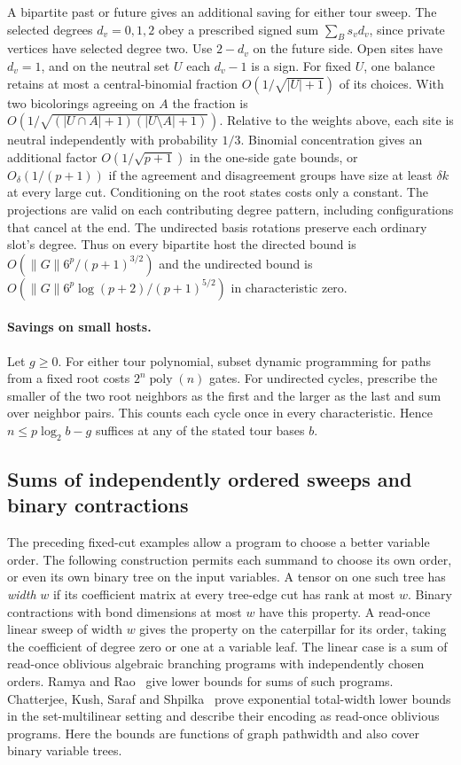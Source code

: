\documentclass[11pt]{article}
\theoremstyle{definition}
\begin{document}
A bipartite past or future gives an additional saving for either tour sweep. The selected degrees \(d_v=0,1,2\) obey a prescribed signed sum \(\sum_B s_v d_v\), since private vertices have selected degree two. Use \(2-d_v\) on the future side. Open sites have \(d_v=1\), and on the neutral set \(U\) each \(d_v-1\) is a sign. For fixed \(U\), one balance retains at most a central-binomial fraction \(O(1/\sqrt{|U|+1})\) of its choices. With two bicolorings agreeing on \(A\) the fraction is \(O(1/\sqrt{(|U\cap A|+1)(|U\setminus A|+1)})\). Relative to the weights above, each site is neutral independently with probability \(1/3\). Binomial concentration gives an additional factor \(O(1/\sqrt{p+1})\) in the one-side gate bounds, or \(O_\delta(1/(p+1))\) if the agreement and disagreement groups have size at least \(\delta k\) at every large cut. Conditioning on the root states costs only a constant. The projections are valid on each contributing degree pattern, including configurations that cancel at the end. The undirected basis rotations preserve each ordinary slot's degree. Thus on every bipartite host the directed bound is \(O(\|G\|6^p/(p+1)^{3/2})\) and the undirected bound is \(O(\|G\|6^p\log(p+2)/(p+1)^{5/2})\) in characteristic zero.

\paragraph{Savings on small hosts.} Let \(g\ge0\). For either tour polynomial, subset dynamic programming for paths from a fixed root costs \(2^n\operatorname{poly}(n)\) gates. For undirected cycles, prescribe the smaller of the two root neighbors as the first and the larger as the last and sum over neighbor pairs. This counts each cycle once in every characteristic. Hence \(n\le p\log_2 b-g\) suffices at any of the stated tour bases \(b\).

\subsection{Sums of independently ordered sweeps and binary contractions}\label{sec:orders}

The preceding fixed-cut examples allow a program to choose a better variable order. The following construction permits each summand to choose its own order, or even its own binary tree on the input variables. A tensor on one such tree has \emph{width} \(w\) if its coefficient matrix at every tree-edge cut has rank at most \(w\). Binary contractions with bond dimensions at most \(w\) have this property. A read-once linear sweep of width \(w\) gives the property on the caterpillar for its order, taking the coefficient of degree zero or one at a variable leaf. The linear case is a sum of read-once oblivious algebraic branching programs with independently chosen orders. Ramya and Rao~\cite[Theorem~1]{ramya-rao-roabps} give lower bounds for sums of such programs. Chatterjee, Kush, Saraf and Shpilka~\cite[Theorems~1.6 and~1.6$'$ and Section~1.4]{ckss-roabps} prove exponential total-width lower bounds in the set-multilinear setting and describe their encoding as read-once oblivious programs. Here the bounds are functions of graph pathwidth and also cover binary variable trees.
\end{document}
